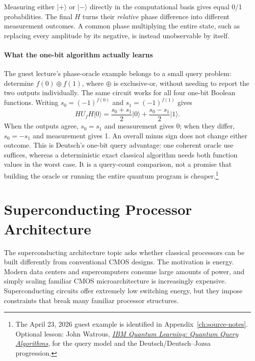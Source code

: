Measuring either $\lvert+\rangle$ or $\lvert-\rangle$ directly in the computational basis gives equal 0/1 probabilities.
The final $H$ turns their \emph{relative} phase difference into different measurement outcomes.
A common phase multiplying the entire state, such as replacing every amplitude by its negative, is instead unobservable by itself.

\paragraph{What the one-bit algorithm actually learns}
The guest lecture's phase-oracle example belongs to a small query problem: determine $f(0)\oplus f(1)$, where $\oplus$ is exclusive-or, without needing to report the two outputs individually.
The same circuit works for all four one-bit Boolean functions.
Writing $s_0=(-1)^{f(0)}$ and $s_1=(-1)^{f(1)}$ gives
\begin{equation}\label{eq:deutsch-one-bit-result}
    H U_f H\lvert0\rangle
    =\frac{s_0+s_1}{2}\lvert0\rangle
     +\frac{s_0-s_1}{2}\lvert1\rangle.
\end{equation}
When the outputs agree, $s_0=s_1$ and measurement gives 0; when they differ, $s_0=-s_1$ and measurement gives 1.
An overall minus sign does not change either outcome.
This is Deutsch's one-bit query advantage: one coherent oracle use suffices, whereas a deterministic exact classical algorithm needs both function values in the worst case.
It is a query-count comparison, not a promise that building the oracle or running the entire quantum program is cheaper.\footnote{The April 23, 2026 guest example is identified in Appendix~\ref{ch:source-notes}. Optional lesson: John Watrous, \href{https://quantum.cloud.ibm.com/learning/en/courses/fundamentals-of-quantum-algorithms/quantum-query-algorithms/introduction}{\emph{IBM Quantum Learning: Quantum Query Algorithms}}, for the query model and the Deutsch/Deutsch--Jozsa progression.}


\section{Superconducting Processor Architecture}\label{sec:appd-superconducting}
The superconducting architecture topic asks whether classical processors can be built differently from conventional CMOS designs.
The motivation is energy.
Modern data centers and supercomputers consume large amounts of power, and simply scaling familiar CMOS microarchitecture is increasingly expensive.
Superconducting circuits offer extremely low switching energy, but they impose constraints that break many familiar processor structures.


